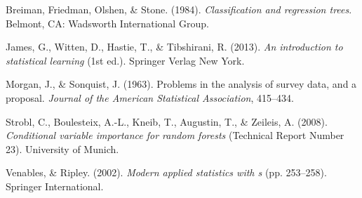 \documentclass[12pt,twoside]{reedthesis}
\begin{document}
  \hypertarget{ref-bibCART}{}
  Breiman, Friedman, Olshen, \& Stone. (1984). \emph{Classification and
  regression trees}. Belmont, CA: Wadsworth International Group.
  
  \hypertarget{ref-bibISL}{}
  James, G., Witten, D., Hastie, T., \& Tibshirani, R. (2013). \emph{An
  introduction to statistical learning} (1st ed.). Springer Verlag New
  York.
  
  \hypertarget{ref-morganSonquist}{}
  Morgan, J., \& Sonquist, J. (1963). Problems in the analysis of survey
  data, and a proposal. \emph{Journal of the American Statistical
  Association}, 415--434.
  
  \hypertarget{ref-bibstrobl2008}{}
  Strobl, C., Boulesteix, A.-L., Kneib, T., Augustin, T., \& Zeileis, A.
  (2008). \emph{Conditional variable importance for random forests}
  (Technical Report Number 23). University of Munich.
  
  \hypertarget{ref-MASS}{}
  Venables, \& Ripley. (2002). \emph{Modern applied statistics with s}
  (pp. 253--258). Springer International.


\end{document}
